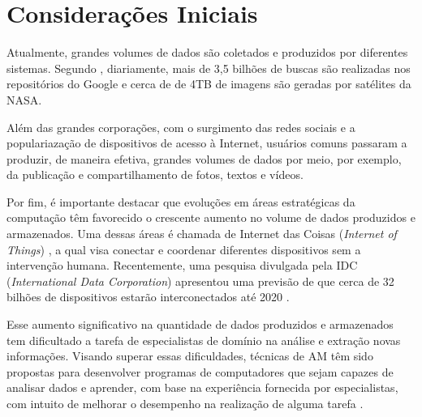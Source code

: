 \documentclass[qual, classic, a4paper]{ufbathesis}
\begin{document}
\listoftables

\mainmatter

% 
% 
% 
%

\label{introducao}

\section{Considerações Iniciais}

Atualmente, grandes volumes de dados são coletados e produzidos por diferentes sistemas. Segundo , diariamente, mais de 3,5 bilhões de buscas são realizadas nos repositórios do Google e cerca de de 4TB de imagens são geradas por satélites da NASA. 

Além das grandes corporações, com o surgimento das redes sociais e a populariazação de dispositivos de acesso à Internet, usuários comuns passaram a produzir, de maneira efetiva, grandes volumes de dados por meio, por exemplo, da publicação e compartilhamento de fotos, textos e vídeos.

Por fim, é importante destacar que evoluções em áreas estratégicas da computação têm favorecido o crescente aumento no volume de dados produzidos e armazenados. Uma dessas áreas é chamada de Internet das Coisas  (\textit{Internet of Things}) \cite{iot}, a qual visa conectar e coordenar diferentes dispositivos sem a intervenção humana. Recentemente, uma pesquisa divulgada pela IDC (\textit{International Data Corporation})  apresentou uma previsão de que cerca de 32 bilhões de dispositivos estarão interconectados até 2020 \cite{iot}. 

Esse aumento significativo na quantidade de dados produzidos e armazenados tem dificultado a tarefa de especialistas de domínio na análise e extração novas informações. Visando superar essas dificuldades, técnicas de \ac{AM} têm sido propostas para desenvolver programas de computadores que sejam capazes de analisar dados e aprender, com base na experiência fornecida por especialistas, com intuito de melhorar o desempenho na realização de alguma tarefa \cite{Mitchell:1997:ML:541177,faceli2011inteligencia}. 
\end{document}
